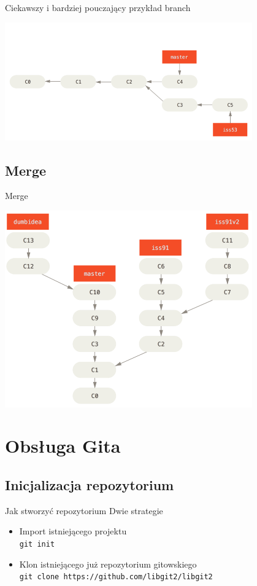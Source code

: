 \documentclass{beamer}
\begin{document}
\begin{frame}
Ciekawszy i bardziej pouczający przykład branch
   \begin{center}
   \includegraphics[width=0.8\textwidth]{./obrazki/fig-3_15.png}
 \end{center}
\end{frame}

\subsection{Merge}
\begin{frame}{Merge}
   \begin{center}
   \includegraphics[width=0.8\textwidth]{./obrazki/fig-3_20.png}
 \end{center}
\end{frame}

\section{Obsługa Gita}

\subsection{Inicjalizacja repozytorium}
\begin{frame}{Jak stworzyć repozytorium}
 Dwie strategie
 \begin{itemize}
  \item Import istniejącego projektu \\
  \texttt{git init}
  \item Klon istniejącego już repozytorium gitowskiego \\
  \texttt{git clone https://github.com/libgit2/libgit2}
 \end{itemize}
\end{frame}
\end{document}
